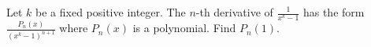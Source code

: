 Let $k$ be a fixed positive integer. The $n$-th derivative of
$\frac{1}{x^k - 1}$ has the form $\frac{P_n(x)}{(x^k - 1)^{n+1}}$
where $P_n(x)$ is a polynomial. Find $P_n(1)$.

